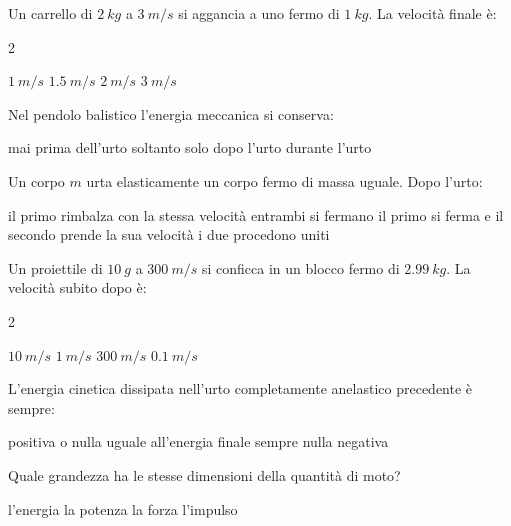 \documentclass[a4paper,10pt]{exam}
\newcommand{\um}[2]{\SI[output-decimal-marker={,}]{#1}{#2}}
\begin{document}
\vspace{2mm}
\begin{questions}
\question Un carrello di $\um{2}{kg}$ a $\um{3}{m/s}$ si aggancia a uno fermo di $\um{1}{kg}$. La velocità finale è:
\vspace{0.2em}
\begin{multicols}{2}
\begin{choices}
\choice $\um{1}{m/s}$
\choice $\um{1.5}{m/s}$
\choice $\um{2}{m/s}$
\choice $\um{3}{m/s}$
\end{choices}
\end{multicols}

\question Nel pendolo balistico l'energia meccanica si conserva:
\vspace{0.2em}
\begin{choices}
\choice mai
\choice prima dell'urto soltanto
\choice solo dopo l'urto
\choice durante l'urto
\end{choices}

\question Un corpo $m$ urta elasticamente un corpo fermo di massa uguale. Dopo l'urto:
\vspace{0.2em}
\begin{choices}
\choice il primo rimbalza con la stessa velocità
\choice entrambi si fermano
\choice il primo si ferma e il secondo prende la sua velocità
\choice i due procedono uniti
\end{choices}

\question Un proiettile di $\um{10}{g}$ a $\um{300}{m/s}$ si conficca in un blocco fermo di $\um{2.99}{kg}$. La velocità subito dopo è:
\vspace{0.2em}
\begin{multicols}{2}
\begin{choices}
\choice $\um{10}{m/s}$
\choice $\um{1}{m/s}$
\choice $\um{300}{m/s}$
\choice $\um{0.1}{m/s}$
\end{choices}
\end{multicols}

\question L'energia cinetica dissipata nell'urto completamente anelastico precedente è sempre:
\vspace{0.2em}
\begin{choices}
\choice positiva o nulla
\choice uguale all'energia finale
\choice sempre nulla
\choice negativa
\end{choices}

\question Quale grandezza ha le stesse dimensioni della quantità di moto?
\vspace{0.2em}
\begin{choices}
\choice l'energia
\choice la potenza
\choice la forza
\choice l'impulso
\end{choices}


\end{questions}
\end{document}
